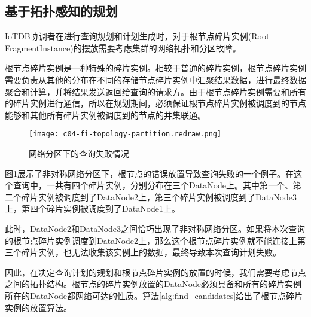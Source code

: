 \subsection{基于拓扑感知的规划}

IoTDB协调者在进行查询规划和计划生成时，对于根节点碎片实例(Root FragmentInstance)的摆放需要考虑集群的网络拓扑和分区故障。

根节点碎片实例是一种特殊的碎片实例。相较于普通的碎片实例，根节点碎片实例需要负责从其他的分布在不同的存储节点碎片实例中汇聚结果数据，进行最终数据聚合和计算，并将结果发送返回给查询的请求方。由于根节点碎片实例需要和所有的碎片实例进行通信，所以在规划期间，必须保证根节点碎片实例被调度到的节点能够和其他所有碎片实例被调度到的节点的并集联通。


\begin{figure}
  \centering
  \texttt{[image: c04-fi-topology-partition.redraw.png]}
  \caption{网络分区下的查询失败情况}
  \label{fig:fi-topology-partition}
\end{figure}

图\ref{fig:fi-topology-partition}展示了非对称网络分区下，根节点的错误放置导致查询失败的一个例子。在这个查询中，一共有四个碎片实例，分别分布在三个DataNode上。其中第一个、第二个碎片实例被调度到了DataNode2上，第三个碎片实例被调度到了DataNode3上，第四个碎片实例被调度到了DataNode1上。

此时，DataNode2和DataNode3之间恰巧出现了非对称网络分区。如果将本次查询的根节点碎片实例调度到DataNode2上，那么这个根节点碎片实例就不能连接上第三个碎片实例，也无法收集该实例上的数据，最终导致本次查询计划失败。

因此，在决定查询计划的规划和根节点碎片实例的放置的时候，我们需要考虑节点之间的拓扑结构。根节点的碎片实例放置的DataNode必须具备和所有的碎片实例所在的DataNode都网络可达的性质。算法\ref{alg:find_candidates}给出了根节点碎片实例的放置算法。


